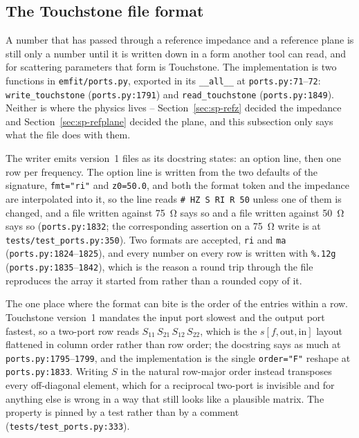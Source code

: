 \subsection{The Touchstone file format}
\label{sec_touchstone}

A number that has passed through a reference impedance and a reference plane is still only a number until it is
written down in a form another tool can read, and for scattering parameters that form is Touchstone. The
implementation is two functions in \texttt{emfit/ports.py}, exported in its \texttt{\_\_all\_\_} at
\texttt{ports.py:71}--\texttt{72}: \texttt{write\_touchstone} (\texttt{ports.py:1791}) and
\texttt{read\_touchstone} (\texttt{ports.py:1849}). Neither is where the physics lives --
Section~\ref{sec:sp-refz} decided the impedance and Section~\ref{sec:sp-refplane} decided the plane, and this
subsection only says what the file does with them.

The writer emits version~1 files as its docstring states: an option line, then one row per frequency. The option
line is written from the two defaults of the signature, \texttt{fmt="ri"} and \texttt{z0=50.0}, and both
the format token and the impedance are interpolated into it, so the line reads \texttt{\# HZ S RI R 50}
unless one of them is changed, and a file written against \SI{75}{\ohm} says so and a file written against
\SI{50}{\ohm} says so
(\texttt{ports.py:1832}; the corresponding assertion on a \SI{75}{\ohm} write is at
\texttt{tests/test\_ports.py:350}). Two formats are accepted, \texttt{ri} and \texttt{ma}
(\texttt{ports.py:1824}--\texttt{1825}), and every number on every row is written with \texttt{\%.12g}
(\texttt{ports.py:1835}--\texttt{1842}), which is the reason a round trip through the file reproduces the array it
started from rather than a rounded copy of it.

The one place where the format can bite is the order of the entries within a row. Touchstone version~1 mandates the
input port slowest and the output port fastest, so a two-port row reads $S_{11}\,S_{21}\,S_{12}\,S_{22}$, which is
the $s[f,\text{out},\text{in}]$ layout flattened in column order rather than row order; the docstring says as much
at \texttt{ports.py:1795}--\texttt{1799}, and the implementation is the single \texttt{order="F"} reshape at
\texttt{ports.py:1833}. Writing $S$ in the natural row-major order instead transposes every off-diagonal element,
which for a reciprocal two-port is invisible and for anything else is wrong in a way that still looks like a
plausible matrix. The property is pinned by a test rather than by a comment
(\texttt{tests/test\_ports.py:333}).

